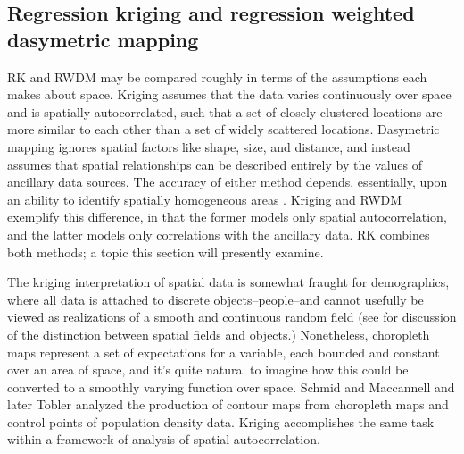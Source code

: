\documentclass[]{interact}
\theoremstyle{plain}%
\theoremstyle{definition}
\theoremstyle{remark}
\begin{document}
\subsection{Regression kriging and regression weighted dasymetric mapping}

RK and RWDM may be compared roughly in terms of the assumptions each makes about space.  Kriging assumes that the data varies continuously over space and is spatially autocorrelated, such that a set of closely clustered locations are more similar to each other than a set of widely scattered locations.  Dasymetric mapping ignores spatial factors like shape, size, and distance, and instead assumes that spatial relationships can be described entirely by the values of ancillary data sources.  The accuracy of either method depends, essentially, upon an ability to identify spatially homogeneous areas \citep{maantay07, maantay08}.  Kriging and RWDM exemplify this difference, in that the former models only spatial autocorrelation, and the latter models only correlations with the ancillary data.  RK combines both methods; a topic this section will presently examine.

The kriging interpretation of spatial data is somewhat fraught for demographics, where all data is attached to discrete objects--people--and cannot usefully be viewed as realizations of a smooth and continuous random field (see \citep{cova02, kjenstad06} for discussion of the distinction between spatial fields and objects.)  Nonetheless, choropleth maps represent a set of expectations for a variable, each bounded and constant over an area of space, and it's quite natural to imagine how this could be converted to a smoothly varying function over space.  Schmid and Maccannell\cite{schmid55} and later Tobler \cite{tobler79} analyzed the production of contour maps from choropleth maps and control points of population density data.  Kriging accomplishes the same task within a framework of analysis of spatial autocorrelation.
\end{document}
